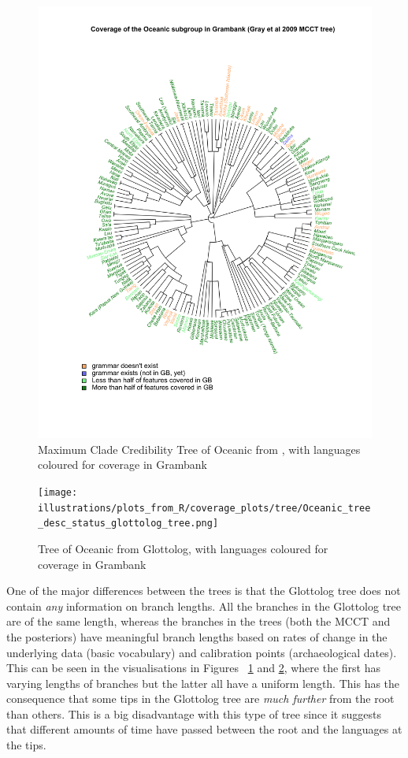 \documentclass[12pt,letterpaper]{article}
\begin{document}
\begin{figure}[ht]
\centering
\includegraphics[width=\textwidth]{illustrations/plots_from_R/coverage_plots/tree/Oceanic_tree_desc_status_gray_et_al_tree_mcct.png}
\caption{{Maximum Clade Credibility Tree of Oceanic from \citet{grayetal_2009}, with languages coloured for coverage in Grambank}}
\label{tree_coverage_oceanic_gray}
\end{figure}

\begin{figure}[ht]
\centering
\texttt{[image: illustrations/plots\_from\_R/coverage\_plots/tree/Oceanic\_tree\_desc\_status\_glottolog\_tree.png]}
\caption{Tree of Oceanic from Glottolog, with languages coloured for coverage in Grambank}
\label{tree_coverage_oceanic_glottolog}
\end{figure}

One of the major differences between the trees is that the Glottolog tree does not contain \textit{any} information on branch lengths. All the branches in the Glottolog tree are of the same length, whereas the branches in the \citet{grayetal_2009} trees (both the MCCT and the posteriors) have meaningful branch lengths based on rates of change in the underlying data (basic vocabulary) and calibration points (archaeological dates). This can be seen in the visualisations in Figures ~\ref{tree_coverage_oceanic_gray} and \ref{tree_coverage_oceanic_glottolog}, where the first has varying lengths of branches but the latter all have a uniform length. This has the consequence that some tips in the Glottolog tree are \textit{much further} from the root than others. This is a big disadvantage with this type of tree since it suggests that different amounts of time have passed between the root and the languages at the tips. 
\end{document}
